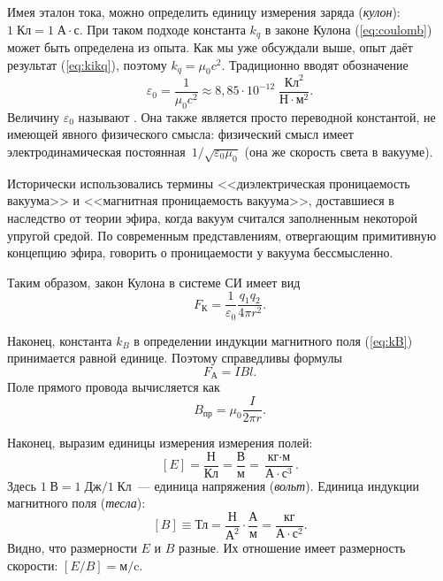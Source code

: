Имея эталон тока, можно определить единицу измерения заряда (\emph{кулон}):
$1\;\text{Кл}=1\;\text{А}\cdot\text{с}$. При таком подходе константа
$k_{q}$ в законе Кулона (\ref{eq:coulomb}) может быть определена
из опыта. Как мы уже обсуждали выше, опыт даёт результат (\ref{eq:kikq}),
поэтому $k_{q}=\mu_{0}c^{2}$. Традиционно вводят обозначение
\begin{equation}
\varepsilon_{0}=\frac{1}{\mu_{0}c^{2}}\approx8{,}85\cdot10^{-12}\;\frac{\text{Кл}^{2}}{\text{Н}\cdot\text{м}^{2}}.
\end{equation}
Величину $\varepsilon_{0}$ называют .
Она также является просто переводной константой, не имеющей
явного физического смысла: физический смысл имеет электродинамическая
постоянная~$1/\sqrt{\varepsilon_{0}\mu_{0}}$ (она же скорость
света в вакууме).
\begin{lab:note}
Исторически использовались термины <<диэлектрическая
проницаемость вакуума>> и <<магнитная проницаемость
вакуума>>, доставшиеся в наследство от теории эфира,
когда вакуум считался заполненным некоторой упругой средой. По современным
представлениям, отвергающим примитивную концепцию эфира, говорить
о проницаемости у вакуума бессмысленно.
\end{lab:note}


Таким образом, закон Кулона в системе СИ имеет вид
\begin{equation}
F_{\text{К}}=\frac{1}{\varepsilon_{0}}\frac{q_{1}q_{2}}{4\pi r^{2}}.
\end{equation}

Наконец, константа $k_{B}$ в определении индукции магнитного поля
(\ref{eq:kB}) принимается равной единице. Поэтому справедливы формулы
\begin{equation}
F_{\text{А}}=IBl.
\end{equation}
Поле прямого провода вычисляется как
\[
B_{\text{пр}}=\mu_{0}\dfrac{I}{2\pi r}.
\]

Наконец, выразим единицы измерения измерения полей:
\[
\left[E\right]=\frac{\text{Н}}{\text{Кл}}=\frac{\text{В}}{\text{м}}=
\frac{\text{кг}\cdot\text{м}}{\text{А}\cdot\text{с}^{3}}.
\]
Здесь $1\;\text{В}=1\;\text{Дж}/1\;\text{Кл}$~--- единица напряжения
(\emph{вольт}). Единица индукции магнитного поля (\emph{тесла}):
\[
\left[B\right]\equiv\text{Тл}=
\frac{\text{Н}}{\text{А}^{2}}\cdot\frac{\text{А}}{\text{м}}=
\frac{\text{кг}}{\text{А}\cdot\text{с}^{2}}.
\]
Видно, что размерности $E$ и $B$ разные. Их отношение имеет размерность
скорости: $\left[E/B\right]=\text{м/c}$.

